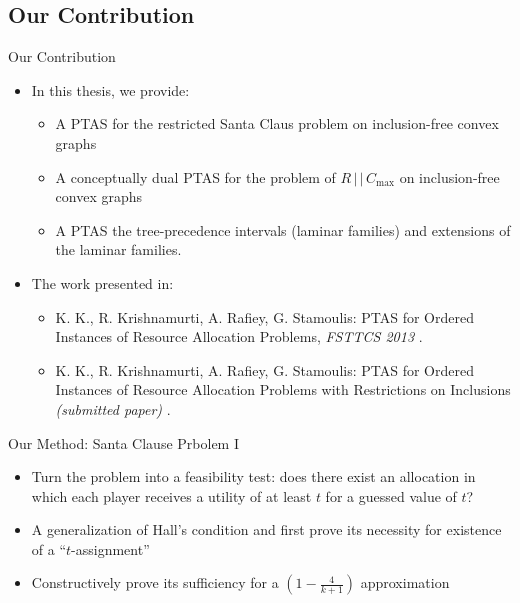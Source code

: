 \documentclass[10pt]{beamer}
\begin{document}
\subsection{Our Contribution}
\begin{frame}{Our Contribution}	
    \begin{itemize}
    	\item<1-> In this thesis, we provide:
        \begin{itemize}
	    	\item<2-> A PTAS for the restricted Santa Claus problem on inclusion-free convex graphs
        	\item<3-> A conceptually dual PTAS for the problem of $R \, | \, | \, C_{\max}$ on inclusion-free convex graphs
        	\item<4-> A PTAS the tree-precedence intervals (\alert{laminar families}) and extensions of the laminar families.
    	\end{itemize}
		\item<4-> The work presented in:
    	\begin{itemize}
    		\item<5-> K. K., R. Krishnamurti, A. Rafiey, G. Stamoulis:
\alert{PTAS for Ordered Instances of Resource Allocation Problems}, \emph{FSTTCS 2013} \cite{KKRS13}.
        	\item<6-> K. K., R. Krishnamurti, A. Rafiey, G. Stamoulis:
\alert{PTAS for Ordered Instances of Resource Allocation Problems with Restrictions on Inclusions} \emph{(submitted paper)} \cite{KKRS16}.
		\end{itemize}
    \end{itemize}
\end{frame}

\begin{frame}{Our Method: Santa Clause Prbolem I}
	\begin{itemize}
    	\item<1-> Turn the problem into a feasibility test: does there exist an allocation in which each player receives a utility of at least $t$ for a \alert{guessed} value of $t$?
        \item<2-> A generalization of \alert{Hall's condition} and first prove its necessity for existence of a ``$t$-assignment''
        \item<3-> Constructively prove its sufficiency for a \alert{$(1 - \frac{4}{k + 1})$} approximation
    \end{itemize}
\end{frame}
\end{document}

